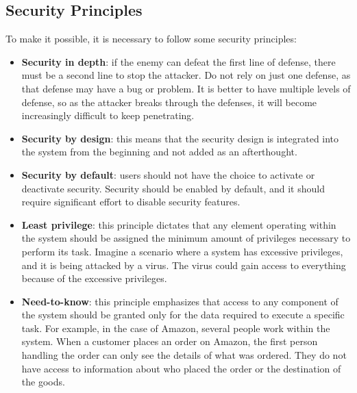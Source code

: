 \subsection*{Security Principles}
To make it possible, it is necessary to follow some security principles:
\begin{itemize}
  \item \textbf{Security in depth}: if the enemy can defeat the first line of defense, there must be a second line to stop the attacker. Do not rely on just one defense, as that defense may have a bug or problem. It is better to have multiple levels of defense, so as the attacker breaks through the defenses, it will become increasingly difficult to keep penetrating.
  
  \item \textbf{Security by design}: this means that the security design is integrated into the system from the beginning and not added as an afterthought.
  
  \item \textbf{Security by default}: users should not have the choice to activate or deactivate security. Security should be enabled by default, and it should require significant effort to disable security features.
  
  \item \textbf{Least privilege}: this principle dictates that any element operating within the system should be assigned the minimum amount of privileges necessary to perform its task. Imagine a scenario where a system has excessive privileges, and it is being attacked by a virus. The virus could gain access to everything because of the excessive privileges.
  
  \item \textbf{Need-to-know}: this principle emphasizes that access to any component of the system should be granted only for the data required to execute a specific task. For example, in the case of Amazon, several people work within the system. When a customer places an order on Amazon, the first person handling the order can only see the details of what was ordered. They do not have access to information about who placed the order or the destination of the goods.
\end{itemize}

